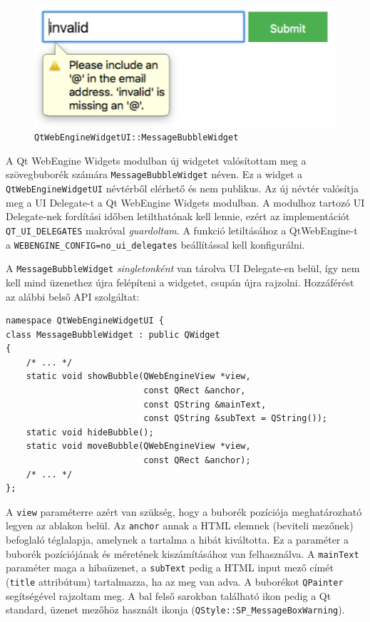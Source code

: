 \documentclass[12pt]{report}
\begin{document}
\begin{figure}[h]
    \centering
    \includegraphics[scale=0.7]{bubi-widget-screenshot}
    \caption{
        \label{fig:bubi-widget-screenshot}
        \texttt{QtWebEngineWidgetUI::MessageBubbleWidget}
    }
\end{figure}

A Qt WebEngine Widgets modulban új widgetet valósítottam meg a szövegbuborék számára
\texttt{MessageBubbleWidget} néven. Ez a widget a \texttt{QtWebEngineWidgetUI} névtérből
elérhető és nem publikus. Az új névtér valósítja meg a UI Delegate-t a Qt WebEngine Widgets
modulban. A modulhoz tartozó UI Delegate-nek fordítási időben letilthatónak kell lennie,
ezért az implementációt \texttt{QT\_UI\_DELEGATES} makróval \textit{guardoltam}. A funkció
letiltásához a QtWebEngine-t a \texttt{WEBENGINE\_CONFIG=no\_ui\_delegates} beállítással kell
konfigurálni.

A \texttt{MessageBubbleWidget} \textit{singletonként} van tárolva UI Delegate-en belül,
így nem kell mind üzenethez újra felépíteni a widgetet, csupán újra rajzolni. Hozzáférést
az alábbi belső API szolgáltat:
\newpage
\begin{lstlisting}[title=src/webenginewidgets/ui/messagebubblewidget\_p.h]
namespace QtWebEngineWidgetUI {
class MessageBubbleWidget : public QWidget
{
    /* ... */
    static void showBubble(QWebEngineView *view,
                           const QRect &anchor,
                           const QString &mainText,
                           const QString &subText = QString());
    static void hideBubble();
    static void moveBubble(QWebEngineView *view,
                           const QRect &anchor);
    /* ... */
};
\end{lstlisting}
A \texttt{view} paraméterre azért van szükség, hogy a buborék pozíciója meghatározható legyen
az ablakon belül. Az \texttt{anchor} annak a HTML elemnek (beviteli mezőnek) befoglaló
téglalapja, amelynek a tartalma a hibát kiváltotta. Ez a paraméter a buborék pozíciójának és
méretének kiszámításához van felhasználva. A \texttt{mainText} paraméter maga a hibaüzenet,
a \texttt{subText} pedig a HTML input mező címét (\texttt{title} attribútum) tartalmazza, ha
az meg van adva. A buborékot \texttt{QPainter} segítségével rajzoltam meg. A bal felső
sarokban található ikon pedig a Qt standard, üzenet mezőhöz használt ikonja
(\texttt{QStyle::SP\_MessageBoxWarning}).
\end{document}
